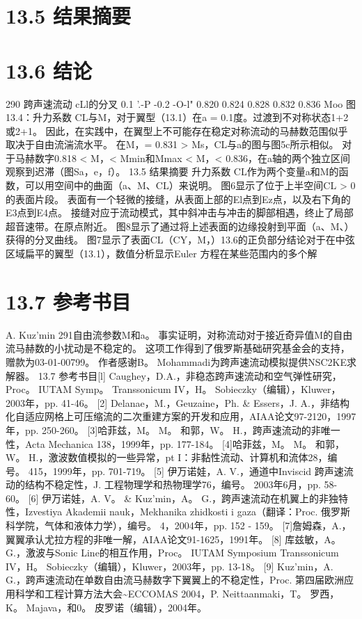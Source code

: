 \documentclass[UTF8,11pt,a4paper,openany,fontset=fandol]{ctexbook}
\begin{document}
\section{13.5 结果摘要}
\section{13.6 结论}
290 跨声速流动 cLl的分叉 0.1 '.-P -0.2 -O-l" 0.820 0.824 0.828 0.832 0.836 Moo 图13.4：升力系数 CL与M，对于翼型（13.1）在a = 0.1度。过渡到不对称状态1+2或2+1。 因此，在实践中，在翼型上不可能存在稳定对称流动的马赫数范围似乎取决于自由流湍流水平。 在M，= 0.831 > Ms，CL与a的图与图5c所示相似。 对于马赫数字0.818 < M，< Mmin和Mmax < M，< 0.836，在a轴的两个独立区间观察到迟滞（图Sa，e，f）。 13.5 结果摘要 升力系数 CL作为两个变量a和M的函数，可以用空间中的曲面（a、M、CL）来说明。 图6显示了位于上半空间CL > 0的表面片段。 表面有一个轻微的接缝，从表面上部的El点到Ez点，以及右下角的E3点到E4点。 接缝对应于流动模式，其中斜冲击与冲击的脚部相遇，终止了局部超音速带。在原点附近。 图8显示了通过将上述表面的边缘投射到平面（a、M、）获得的分叉曲线。 图7显示了表面CL（CY，M，）13.6的正负部分结论对于在中弦区域扁平的翼型（13.1），数值分析显示Euler 方程在某些范围内的多个解

\section{13.7 参考书目}
A. Kuz'min 291自由流参数M和a。 事实证明，对称流动对于接近奇异值M的自由流马赫数的小扰动是不稳定的。 这项工作得到了俄罗斯基础研究基金会的支持，赠款为03-01-00799。 作者感谢B。 Mohammadi为跨声速流动模拟提供NSC2KE求解器。 13.7 参考书目[l] Caughey，D.A.，非稳态跨声速流动和空气弹性研究，Proc。 IUTAM Symp。 Transsonicum IV，H。 Sobieczky（编辑），Kluwer，2003年，pp. 41-46。 [2] Delanae，M.，Geuzaine，Ph. \& Essers，J. A.，非结构化自适应网格上可压缩流的二次重建方案的开发和应用，AIAA论文97-2120，1997年，pp. 250-260。 [3]哈菲兹，M。 M。 和郭，W。 H.，跨声速流动的非唯一性，Acta Mechanica 138，1999年，pp. 177-184。 [4]哈菲兹，M。 M。 和郭，W。 H.，激波数值模拟的一些异常，pt I：非黏性流动、计算机和流体28，编号。 415，1999年，pp. 701-719。 [5] 伊万诺娃，A. V.，通道中Inviscid 跨声速流动的结构不稳定性，J. 工程物理学和热物理学76，编号。 2003年6月，pp. 58-60。 [6] 伊万诺娃，A. V。 \& Kuz'min，A。 G.，跨声速流动在机翼上的非独特性，Izvestiya Akademii nauk，Mekhanika zhidkosti i gaza（翻译：Proc. 俄罗斯科学院，气体和液体力学），编号。 4，2004年，pp. 152 - 159。 [7]詹姆森，A.，翼翼承认尤拉方程的非唯一解，AIAA论文91-1625，1991年。 [8] 库兹敏，A。 G.，激波与Sonic Line的相互作用，Proc。 IUTAM Symposium Transsonicum IV，H。 Sobieczky（编辑），Kluwer，2003年，pp. 13-18。 [9] Kuz'min，A. G.，跨声速流动在单数自由流马赫数字下翼翼上的不稳定性，Proc. 第四届欧洲应用科学和工程计算方法大会\textasciitilde{}ECCOMAS 2004，P. Neittaanmaki，T。 罗西，K。 Majava，和0。 皮罗诺（编辑），2004年。
\end{document}
